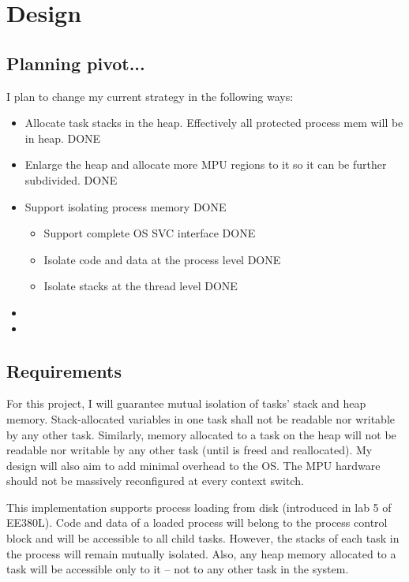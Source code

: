 \chapter{Design}

\section{Planning pivot...}

I plan to change my current strategy in the following ways:

\begin{itemize}
    
 \item Allocate task stacks in the heap. Effectively all protected process mem will be in heap. DONE
 \item Enlarge the heap and allocate more MPU regions to it so it can be further subdivided. DONE
 \item Support isolating process memory DONE
    \begin{itemize}
        \item Support complete OS SVC interface DONE
        \item Isolate code and data at the process level DONE
        \item Isolate stacks at the thread level DONE
    \end{itemize}
 \item {}
 \item {}

\end{itemize}


\section{Requirements}

For this project, I will guarantee mutual isolation of tasks' stack and heap memory. Stack-allocated variables in one task shall not be readable nor writable by any other task. Similarly, memory allocated to a task on the heap will not be readable nor writable by any other task (until is freed and reallocated). My design will also aim to add minimal overhead to the OS. The MPU hardware should not be massively reconfigured at every context switch.

This implementation supports process loading from disk (introduced in lab 5 of EE380L). Code and data of a loaded process will belong to the process control block and will be accessible to all child tasks. However, the stacks of each task in the process will remain mutually isolated. Also, any heap memory allocated to a task will be accessible only to it -- not to any other task in the system.


